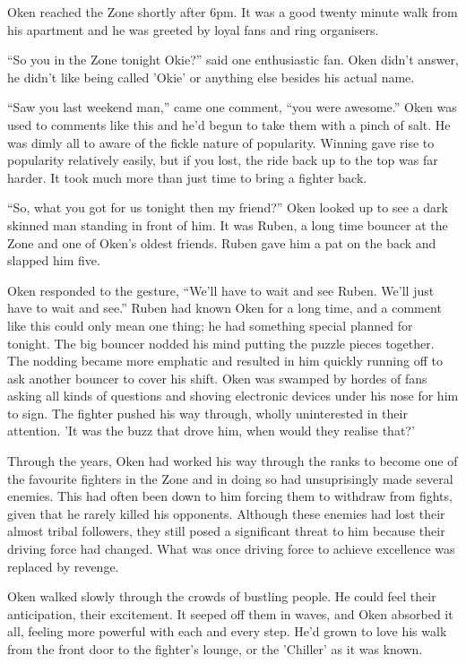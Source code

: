 \thoughtbreak

Oken reached the Zone shortly after 6pm. It was a good twenty minute walk from his apartment and he was greeted by loyal fans and ring organisers.

``So you in the Zone tonight Okie?'' said one enthusiastic fan. Oken didn't answer, he didn't like being called 'Okie' or anything else besides his actual name.

``Saw you last weekend man,'' came one comment, ``you were awesome.'' Oken was used to comments like this and he'd begun to take them with a pinch of salt. He was dimly all to aware of the fickle nature of popularity. Winning gave rise to popularity relatively easily, but if you lost, the ride back up to the top was far harder. It took much more than just time to bring a fighter back.

``So, what you got for us tonight then my friend?'' Oken looked up to see a dark skinned man standing in front of him. It was Ruben, a long time bouncer at the Zone and one of Oken's oldest friends. Ruben gave him a pat on the back and slapped him five.

Oken responded to the gesture, ``We'll have to wait and see Ruben. We'll just have to wait and see.'' Ruben had known Oken for a long time, and a comment like this could only mean one thing; he had something special planned for tonight. The big bouncer nodded his mind putting the puzzle pieces together. The nodding became more emphatic and resulted in him quickly running off to ask another bouncer to cover his shift. Oken was swamped by hordes of fans asking all kinds of questions and shoving electronic devices under his nose for him to sign. The fighter pushed his way through, wholly uninterested in their attention. 'It was the buzz that drove him, when would they realise that?'

Through the years, Oken had worked his way through the ranks to become one of the favourite fighters in the Zone and in doing so had unsuprisingly made several enemies. This had often been down to him forcing them to withdraw from fights, given that he rarely killed his opponents. Although these enemies had lost their almost tribal followers, they still posed a significant threat to him because their driving force had changed. What was once driving force to achieve excellence was replaced by revenge.

Oken walked slowly through the crowds of bustling people. He could feel their anticipation, their excitement. It seeped off them in waves, and Oken absorbed it all, feeling more powerful with each and every step. He'd grown to love his walk from the front door to the fighter's lounge, or the 'Chiller' as it was known.

